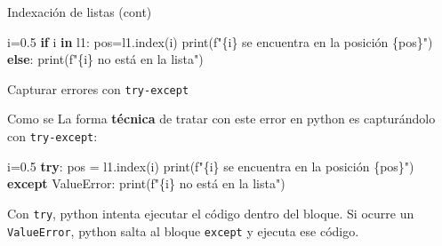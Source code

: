 \documentclass[
  ignorenonframetext,
  aspectratio=169,
  spanish,
]{beamer}
\newenvironment{Shaded}{\begin{snugshade}}{\end{snugshade}}
\newcommand{\BuiltInTok}[1]{\textcolor[rgb]{0.00,0.23,0.31}{#1}}
\newcommand{\ControlFlowTok}[1]{\textcolor[rgb]{0.00,0.23,0.31}{\textbf{#1}}}
\newcommand{\FloatTok}[1]{\textcolor[rgb]{0.68,0.00,0.00}{#1}}
\newcommand{\KeywordTok}[1]{\textcolor[rgb]{0.00,0.23,0.31}{\textbf{#1}}}
\newcommand{\NormalTok}[1]{\textcolor[rgb]{0.00,0.23,0.31}{#1}}
\newcommand{\OperatorTok}[1]{\textcolor[rgb]{0.37,0.37,0.37}{#1}}
\newcommand{\PreprocessorTok}[1]{\textcolor[rgb]{0.68,0.00,0.00}{#1}}
\newcommand{\SpecialCharTok}[1]{\textcolor[rgb]{0.37,0.37,0.37}{#1}}
\newcommand{\SpecialStringTok}[1]{\textcolor[rgb]{0.13,0.47,0.30}{#1}}
\begin{document}
\begin{frame}[fragile]{Indexación de listas (cont)}
\label{indexaciuxf3n-de-listas-cont-1}
\begin{Shaded}
\begin{Highlighting}[]
\NormalTok{i}\OperatorTok{=}\FloatTok{0.5}
\ControlFlowTok{if}\NormalTok{ i }\KeywordTok{in}\NormalTok{ l1:}
\NormalTok{  pos}\OperatorTok{=}\NormalTok{l1.index(i) }
  \BuiltInTok{print}\NormalTok{(}\SpecialStringTok{f"}\SpecialCharTok{\{}\NormalTok{i}\SpecialCharTok{\}}\SpecialStringTok{ se encuentra en la posición }\SpecialCharTok{\{}\NormalTok{pos}\SpecialCharTok{\}}\SpecialStringTok{"}\NormalTok{)}
\ControlFlowTok{else}\NormalTok{:}
    \BuiltInTok{print}\NormalTok{(}\SpecialStringTok{f"}\SpecialCharTok{\{}\NormalTok{i}\SpecialCharTok{\}}\SpecialStringTok{ no está en la lista"}\NormalTok{)}
\end{Highlighting}
\end{Shaded}
\end{frame}

\begin{frame}[fragile]{Capturar errores con \texttt{try-except}}
\label{capturar-errores-con-try-except}
\begin{tcolorbox}[enhanced jigsaw, title=\textcolor{quarto-callout-tip-color}{\faLightbulb}\hspace{0.5em}{Tip}, bottomtitle=1mm, opacityback=0, bottomrule=.15mm, arc=.35mm, colframe=quarto-callout-tip-color-frame, colback=white, opacitybacktitle=0.6, colbacktitle=quarto-callout-tip-color!10!white, left=2mm, coltitle=black, leftrule=.75mm, rightrule=.15mm, toptitle=1mm, titlerule=0mm, breakable, toprule=.15mm]

Como se La forma \textbf{técnica} de tratar con este error en python es
capturándolo con \texttt{try-except}:

\begin{Shaded}
\begin{Highlighting}[]
\NormalTok{i}\OperatorTok{=}\FloatTok{0.5}
\ControlFlowTok{try}\NormalTok{:}
\NormalTok{    pos }\OperatorTok{=}\NormalTok{ l1.index(i)}
    \BuiltInTok{print}\NormalTok{(}\SpecialStringTok{f"}\SpecialCharTok{\{}\NormalTok{i}\SpecialCharTok{\}}\SpecialStringTok{ se encuentra en la posición }\SpecialCharTok{\{}\NormalTok{pos}\SpecialCharTok{\}}\SpecialStringTok{"}\NormalTok{)}
\ControlFlowTok{except} \PreprocessorTok{ValueError}\NormalTok{:}
    \BuiltInTok{print}\NormalTok{(}\SpecialStringTok{f"}\SpecialCharTok{\{}\NormalTok{i}\SpecialCharTok{\}}\SpecialStringTok{ no está en la lista"}\NormalTok{)}
\end{Highlighting}
\end{Shaded}

Con \texttt{try}, python intenta ejecutar el código dentro del bloque.
Si ocurre un \texttt{ValueError}, python salta al bloque \texttt{except}
y ejecuta ese código.

\end{tcolorbox}
\end{frame}
\end{document}
